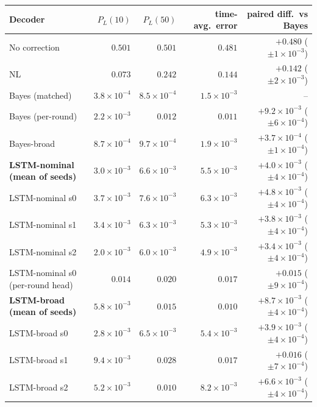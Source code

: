 \begin{tabular}{lrrrr}
\toprule
Decoder & $P_L(10)$ & $P_L(50)$ & time-avg.\ error & paired diff.\ vs Bayes \\
\midrule
No correction & $0.501$ & $0.501$ & $0.481$ & $+0.480$ {\scriptsize($\pm1\!\times\!10^{-3}$)} \\
NL & $0.073$ & $0.242$ & $0.144$ & $+0.142$ {\scriptsize($\pm2\!\times\!10^{-3}$)} \\
Bayes (matched) & $3.8\!\times\!10^{-4}$ & $8.5\!\times\!10^{-4}$ & $1.5\!\times\!10^{-3}$ & -- \\
Bayes (per-round) & $2.2\!\times\!10^{-3}$ & $0.012$ & $0.011$ & $+9.2\!\times\!10^{-3}$ {\scriptsize($\pm6\!\times\!10^{-4}$)} \\
Bayes-broad & $8.7\!\times\!10^{-4}$ & $9.7\!\times\!10^{-4}$ & $1.9\!\times\!10^{-3}$ & $+3.7\!\times\!10^{-4}$ {\scriptsize($\pm1\!\times\!10^{-4}$)} \\
\textbf{LSTM-nominal (mean of seeds)} & $3.0\!\times\!10^{-3}$ & $6.6\!\times\!10^{-3}$ & $5.5\!\times\!10^{-3}$ & $+4.0\!\times\!10^{-3}$ {\scriptsize($\pm4\!\times\!10^{-4}$)} \\
LSTM-nominal s0 & $3.7\!\times\!10^{-3}$ & $7.6\!\times\!10^{-3}$ & $6.3\!\times\!10^{-3}$ & $+4.8\!\times\!10^{-3}$ {\scriptsize($\pm4\!\times\!10^{-4}$)} \\
LSTM-nominal s1 & $3.4\!\times\!10^{-3}$ & $6.3\!\times\!10^{-3}$ & $5.3\!\times\!10^{-3}$ & $+3.8\!\times\!10^{-3}$ {\scriptsize($\pm4\!\times\!10^{-4}$)} \\
LSTM-nominal s2 & $2.0\!\times\!10^{-3}$ & $6.0\!\times\!10^{-3}$ & $4.9\!\times\!10^{-3}$ & $+3.4\!\times\!10^{-3}$ {\scriptsize($\pm4\!\times\!10^{-4}$)} \\
LSTM-nominal s0 (per-round head) & $0.014$ & $0.020$ & $0.017$ & $+0.015$ {\scriptsize($\pm9\!\times\!10^{-4}$)} \\
\textbf{LSTM-broad (mean of seeds)} & $5.8\!\times\!10^{-3}$ & $0.015$ & $0.010$ & $+8.7\!\times\!10^{-3}$ {\scriptsize($\pm4\!\times\!10^{-4}$)} \\
LSTM-broad s0 & $2.8\!\times\!10^{-3}$ & $6.5\!\times\!10^{-3}$ & $5.4\!\times\!10^{-3}$ & $+3.9\!\times\!10^{-3}$ {\scriptsize($\pm4\!\times\!10^{-4}$)} \\
LSTM-broad s1 & $9.4\!\times\!10^{-3}$ & $0.028$ & $0.017$ & $+0.016$ {\scriptsize($\pm7\!\times\!10^{-4}$)} \\
LSTM-broad s2 & $5.2\!\times\!10^{-3}$ & $0.010$ & $8.2\!\times\!10^{-3}$ & $+6.6\!\times\!10^{-3}$ {\scriptsize($\pm4\!\times\!10^{-4}$)} \\
\bottomrule
\end{tabular}